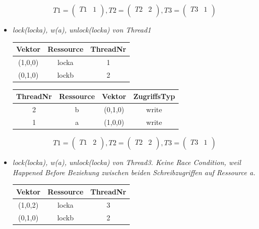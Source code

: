 \documentclass[10pt,a4paper]{article}
\begin{document}
\begin{flushleft}
\begin{itemize}
\begin{tabular}{ >{\small}c >{\small}c >{\small}c >{\small}c }
\end{tabular}
\[
	T1 = \begin{pmatrix}
		T1 & 1\\
	\end{pmatrix}
	, T2 = \begin{pmatrix}
		T2 & 2\\
	\end{pmatrix}
	, T3 = \begin{pmatrix}
		T3 & 1\\
	\end{pmatrix}
\]
\item \textit{lock(locka), w(a), unlock(locka) von Thread1}\\[0.3cm]
\begin{tabular}{ >{\small}c >{\small}c >{\small}c }
  	Vektor & Ressource & ThreadNr \\\hline
  	(1,0,0) & locka & 1 \\
  	(0,1,0) & lockb & 2 \\\hline
\end{tabular}\hspace*{0.5cm}
\begin{tabular}{ >{\small}c >{\small}c >{\small}c >{\small}c }
  	ThreadNr & Ressource & Vektor & ZugriffsTyp \\\hline
  	2 & b & (0,1,0) & write \\
  	1 & a & (1,0,0) & write \\\hline
\end{tabular}
\[
	T1 = \begin{pmatrix}
		T1 & 2\\
	\end{pmatrix}
	, T2 = \begin{pmatrix}
		T2 & 2\\
	\end{pmatrix}
	, T3 = \begin{pmatrix}
		T3 & 1\\
	\end{pmatrix}
\]\newpage
\item \textit{lock(locka), w(a), unlock(locka) von Thread3. Keine Race Condition, weil Happened Before Beziehung zwischen beiden Schreibzugriffen auf Ressource a.}\\[0.3cm]
\begin{tabular}{ >{\small}c >{\small}c >{\small}c }
  	Vektor & Ressource & ThreadNr \\\hline
  	(1,0,2) & locka & 3 \\
  	(0,1,0) & lockb & 2 \\\hline

\end{tabular}
\end{itemize}
\end{flushleft}
\end{document}
